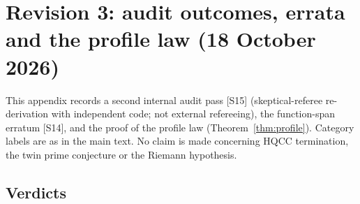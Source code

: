 \documentclass[11pt]{article}
\theoremstyle{definition}
\theoremstyle{plain}
\newcommand{\src}[1]{\textup{[S#1]}}
\begin{document}
\section{Revision 3: audit outcomes, errata and the profile law (18 October 2026)}\label{app:rev3}
This appendix records a second internal audit pass \src{15} (skeptical-referee re-derivation with independent code; not external refereeing),
the function-span erratum \src{14}, and the proof of the profile law (Theorem~\ref{thm:profile}). Category labels are as in the main text. No claim is made
concerning HQCC termination, the twin prime conjecture or the Riemann hypothesis.

\subsection{Verdicts}
\end{document}
